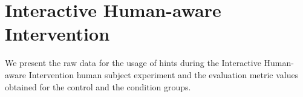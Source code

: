 \chapter{Interactive Human-aware Intervention}
\label{apx:hintsstudy}
We present the raw data for the usage of hints during the Interactive Human-aware Intervention human subject experiment and the evaluation metric values obtained for the control and the condition groups.

\begin{table}[tpb]
\centering
\caption{Users who saw the forbidden car alert message as the first hint. PID is the planning task identifier. $\textup{percent complete} = \frac{\textup{moves until the forbidden alert}}{\textup{number of moves}}$. Threshold indicates the number of moves  from the start during which the Human-aware Intervention agent did not function}
\label{tab:firsthint}
\end{table}
